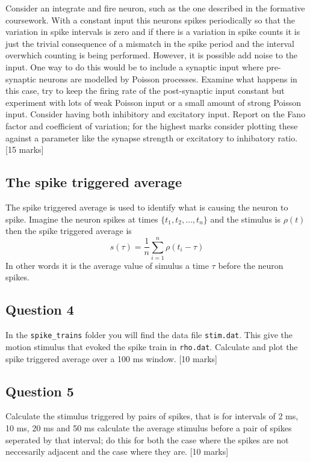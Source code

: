 \documentclass[12pt]{article}
\begin{document}
Consider an integrate and fire neuron, such as the one described in
the formative coursework. With a constant input this neurons spikes
periodically so that the variation in spike intervals is zero and if
there is a variation in spike counts it is just the trivial
consequence of a mismatch in the spike period and the interval
overwhich counting is being performed. However, it is possible add
noise to the input. One way to do this would be to include a synaptic
input where pre-synaptic neurons are modelled by Poisson
processes. Examine what happens in this case, try to keep the firing
rate of the post-synaptic input constant but experiment with lots of
weak Poisson input or a small amount of strong Poisson input. Consider
having both inhibitory and excitatory input. Report on the Fano factor
and coefficient of variation; for the highest marks consider plotting
these against a parameter like the synapse strength or excitatory to
inhibatory ratio. [15 marks]


\subsection*{The spike triggered average}

The spike triggered average is used to identify what is causing the
neuron to spike. Imagine the neuron spikes at times
$\{t_1,t_2,\ldots,t_n\}$ and the stimulus is $\rho(t)$ then the spike
triggered average is
\begin{equation}
s(\tau)=\frac{1}{n}\sum_{i=1}^n \rho(t_i-\tau)
\end{equation}
In other words it is the average value of simulus a time $\tau$ before the
neuron spikes. 

\subsection*{Question 4} 

In the \texttt{spike\_trains} folder you will find the data file
\texttt{stim.dat}. This give the motion stimulus that evoked the spike
train in \texttt{rho.dat}. Calculate and plot the spike triggered
average over a 100 ms window. [10 marks]

\subsection*{Question 5}

Calculate the stimulus triggered by pairs of spikes, that is for
intervals of 2 ms, 10 ms, 20 ms and 50 ms calculate the average
stimulus before a pair of spikes seperated by that interval; do this
for both the case where the spikes are not neccesarily adjacent and
the case where they are. [10 marks]
\end{document}
